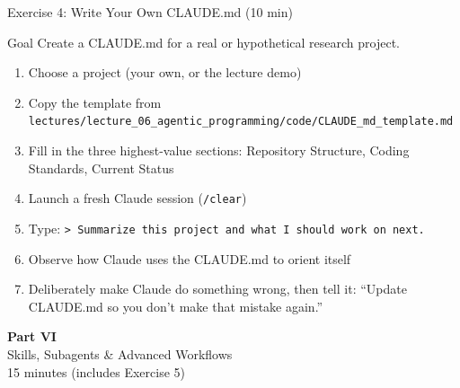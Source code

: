 \documentclass[aspectratio=169,10pt]{beamer}
\newcommand{\emphc}[1]{\textcolor{harvardcrimson}{#1}}
\begin{document}
\begin{frame}[fragile]{Exercise 4: Write Your Own CLAUDE.md {\small(10 min)}}
\begin{exampleblock}{Goal}
Create a CLAUDE.md for a real or hypothetical research project.
\end{exampleblock}

\begin{enumerate}\itemsep2pt
    \item Choose a project (your own, or the lecture demo)
    \item Copy the template from \texttt{lectures/lecture\_06\_agentic\_programming/code/CLAUDE\_md\_template.md}
    \item Fill in the \emphc{three highest-value sections}: Repository Structure, Coding Standards, Current Status
    \item Launch a fresh Claude session (\texttt{/clear})
    \item Type: \texttt{> Summarize this project and what I should work on next.}
    \item Observe how Claude uses the CLAUDE.md to orient itself
    \item Deliberately make Claude do something wrong, then tell it: ``Update CLAUDE.md so you don't make that mistake again.''
\end{enumerate}
\end{frame}


\begin{frame}{}
\vfill
\begin{center}
{\Huge \textcolor{uzhblue}{\textbf{Part VI}}}\\[12pt]
{\LARGE Skills, Subagents \& Advanced Workflows}\\[6pt]
{\small 15 minutes (includes Exercise 5)}
\end{center}
\vfill
\end{frame}
\end{document}
